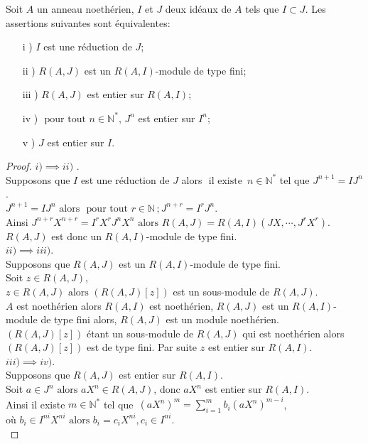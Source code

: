 \begin{maproposition}
	Soit $A$ un anneau noethérien, $I$ et $J$ deux idéaux de $A$ tels que $I \subset J$. Les assertions suivantes sont équivalentes: 
	\begin{enumerate}
		\item[i] ) $I$ est une réduction de $J$;
		\item[ii] ) $R(A,J)$ est un $R(A,I)$-module de type fini;
		\item[iii] ) $R(A,J)$ est entier sur $R(A,I)$;
		\item[iv] ) $\text{ pour tout } n \in \mathbb{N^*}$, $J^n$ est entier sur $I^n$;
		\item[v] ) $J$ est entier sur $I$.
	\end{enumerate}
\end{maproposition}
\begin{proof}
	$i) \implies ii)$ .\\
	Supposons que $I$ est une réduction de $J$ alors $\text{ il existe } \, n \in \mathbb{N}^{*}$ tel que $J^{n+1} = IJ^{n}$.\\
	$J^{n+1} = IJ^{n} \text{ alors } \text{ pour tout } r \in \mathbb{N} \, ; J^{n+r} = I^rJ^{n}$.\\
	Ainsi $J^{n+r} X^{n+r} = I^r X^rJ^{n} X^n \text{ alors } R(A,J) = R(A,I)(JX, \cdots ,J^rX^r)$.\\
	$R(A,J)$ est donc un $R(A,I)$-module de type fini.\\
	$ii) \implies iii)$.\\
	Supposons que $R(A,J)$ est un $R(A,I)$-module de type fini.\\
	Soit $z \in R(A,J)$,\\
	$z \in R(A,J) \text{ alors } (R(A,J)[z])$ est un sous-module de $R(A,J)$.\\
	$A$ est noethérien alors $R(A,I)$ est noethérien, $R(A,J)$ est un $R(A,I)$-module de type fini alors, $R(A,J)$ est un module noethérien.\\
	$(R(A,J)[z])$ étant un sous-module de $R(A,J)$ qui est noethérien alors $(R(A,J)[z])$ est de type fini. Par suite $z$ est entier sur $R(A,I)$.\\
	$iii) \implies iv)$.\\
	Supposons que $R(A,J)$ est entier sur $R(A,I)$.\\
	Soit $a \in J^n \text{ alors } aX^n \in R(A,J)$, donc $aX^n$ est entier sur $R(A,I)$.\\
	Ainsi il existe $m \in \mathbb{N^*}$  tel que  $\, (aX^n)^m = \displaystyle \sum_{i=1}^{m}{b_i (aX^n)^{m-i}}$,\\ où $b_i \in I^{ni} X^{ni} \text{ alors } b_i = c_i X^{ni} , c_i \in I^{ni}$.\\

\end{proof}
